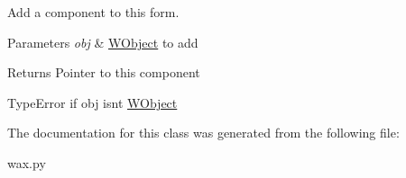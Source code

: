 Add a component to this form. 


\begin{DoxyParams}{Parameters}
{\em obj} & \hyperlink{classwax_1_1WObject}{W\+Object} to add \\
\hline
\end{DoxyParams}
\begin{DoxyReturn}{Returns}
Pointer to this component
\end{DoxyReturn}
Type\+Error if obj isn\textquotesingle{}t \hyperlink{classwax_1_1WObject}{W\+Object} 

The documentation for this class was generated from the following file\+:\begin{DoxyCompactItemize}
\item 
wax.\+py\end{DoxyCompactItemize}
